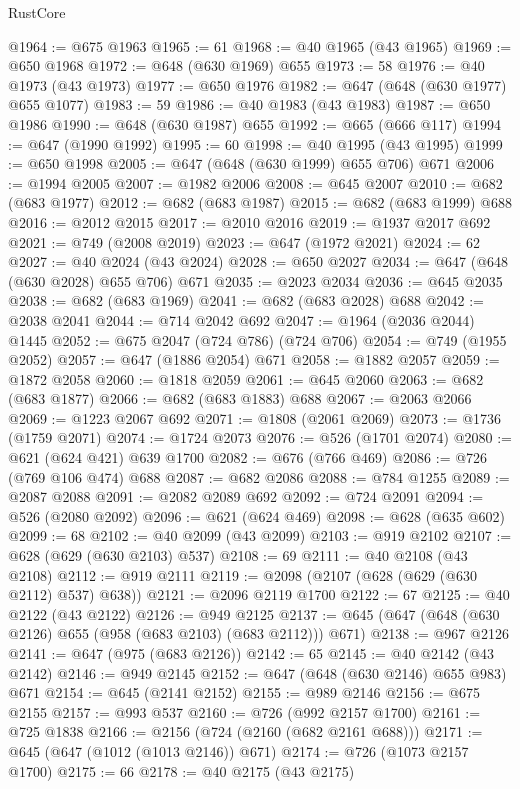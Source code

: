 \begin{lexlean}{RustCore}
\begin{coremodule}
@1964 := @675 @1963
@1965 := 61
@1968 := @40 @1965 (@43 @1965)
@1969 := @650 @1968
@1972 := @648 (@630 @1969) @655
@1973 := 58
@1976 := @40 @1973 (@43 @1973)
@1977 := @650 @1976
@1982 := @647 (@648 (@630 @1977) @655 @1077)
@1983 := 59
@1986 := @40 @1983 (@43 @1983)
@1987 := @650 @1986
@1990 := @648 (@630 @1987) @655
@1992 := @665 (@666 @117)
@1994 := @647 (@1990 @1992)
@1995 := 60
@1998 := @40 @1995 (@43 @1995)
@1999 := @650 @1998
@2005 := @647 (@648 (@630 @1999) @655 @706) @671
@2006 := @1994 @2005
@2007 := @1982 @2006
@2008 := @645 @2007
@2010 := @682 (@683 @1977)
@2012 := @682 (@683 @1987)
@2015 := @682 (@683 @1999) @688
@2016 := @2012 @2015
@2017 := @2010 @2016
@2019 := @1937 @2017 @692
@2021 := @749 (@2008 @2019)
@2023 := @647 (@1972 @2021)
@2024 := 62
@2027 := @40 @2024 (@43 @2024)
@2028 := @650 @2027
@2034 := @647 (@648 (@630 @2028) @655 @706) @671
@2035 := @2023 @2034
@2036 := @645 @2035
@2038 := @682 (@683 @1969)
@2041 := @682 (@683 @2028) @688
@2042 := @2038 @2041
@2044 := @714 @2042 @692
@2047 := @1964 (@2036 @2044) @1445
@2052 := @675 @2047 (@724 @786) (@724 @706)
@2054 := @749 (@1955 @2052)
@2057 := @647 (@1886 @2054) @671
@2058 := @1882 @2057
@2059 := @1872 @2058
@2060 := @1818 @2059
@2061 := @645 @2060
@2063 := @682 (@683 @1877)
@2066 := @682 (@683 @1883) @688
@2067 := @2063 @2066
@2069 := @1223 @2067 @692
@2071 := @1808 (@2061 @2069)
@2073 := @1736 (@1759 @2071)
@2074 := @1724 @2073
@2076 := @526 (@1701 @2074)
@2080 := @621 (@624 @421) @639 @1700
@2082 := @676 (@766 @469)
@2086 := @726 (@769 @106 @474) @688
@2087 := @682 @2086
@2088 := @784 @1255
@2089 := @2087 @2088
@2091 := @2082 @2089 @692
@2092 := @724 @2091
@2094 := @526 (@2080 @2092)
@2096 := @621 (@624 @469)
@2098 := @628 (@635 @602)
@2099 := 68
@2102 := @40 @2099 (@43 @2099)
@2103 := @919 @2102
@2107 := @628 (@629 (@630 @2103) @537)
@2108 := 69
@2111 := @40 @2108 (@43 @2108)
@2112 := @919 @2111
@2119 := @2098 (@2107 (@628 (@629 (@630 @2112) @537) @638))
@2121 := @2096 @2119 @1700
@2122 := 67
@2125 := @40 @2122 (@43 @2122)
@2126 := @949 @2125
@2137 := @645 (@647 (@648 (@630 @2126) @655 (@958 (@683 @2103) (@683 @2112))) @671)
@2138 := @967 @2126
@2141 := @647 (@975 (@683 @2126))
@2142 := 65
@2145 := @40 @2142 (@43 @2142)
@2146 := @949 @2145
@2152 := @647 (@648 (@630 @2146) @655 @983) @671
@2154 := @645 (@2141 @2152)
@2155 := @989 @2146
@2156 := @675 @2155
@2157 := @993 @537
@2160 := @726 (@992 @2157 @1700)
@2161 := @725 @1838
@2166 := @2156 (@724 (@2160 (@682 @2161 @688)))
@2171 := @645 (@647 (@1012 (@1013 @2146)) @671)
@2174 := @726 (@1073 @2157 @1700)
@2175 := 66
@2178 := @40 @2175 (@43 @2175)

\end{coremodule}
\end{lexlean}
